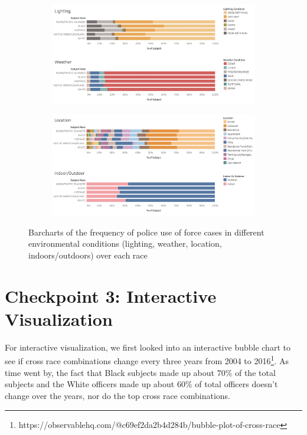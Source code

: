 \documentclass[10pt]{article}
\begin{document}
\begin{figure}[H]
\captionsetup{font=small}
    \begin{subfigure}{0.5\textwidth}
        \includegraphics[width=\textwidth]{img4}
        \label{img4}
    \end{subfigure}%
    \begin{subfigure}{0.5\textwidth}
        \includegraphics[width=\textwidth]{img5}
        \label{img5}
    \end{subfigure}
\label{barcharts}
\caption{Barcharts of the frequency of police use of force cases in different environmental conditions (lighting, weather, location, indoors/outdoors) over each race}
\end{figure}



\section*{Checkpoint 3: Interactive Visualization}

For interactive visualization, we first looked into an interactive bubble chart to see if cross race combinations change every three years from 2004 to 2016\footnote{https://observablehq.com/@c69ef2da2b4d284b/bubble-plot-of-cross-race}. As time went by, the fact that Black subjects made up about 70\% of the total subjects and the White officers made up about 60\% of total officers doesn’t change over the years, nor do the top cross race combinations.
\end{document}

